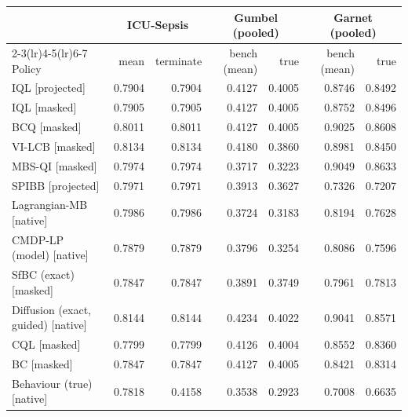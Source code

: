 \begin{tabular}{lrrrrrr}
\toprule
 & \multicolumn{2}{c}{ICU-Sepsis} & \multicolumn{2}{c}{Gumbel (pooled)} & \multicolumn{2}{c}{Garnet (pooled)} \\
\cmidrule(lr){2-3}\cmidrule(lr){4-5}\cmidrule(lr){6-7}
Policy & mean & terminate & bench (mean) & true & bench (mean) & true \\
\midrule
IQL [projected] & 0.7904 & 0.7904 & 0.4127 & 0.4005 & 0.8746 & 0.8492 \\
IQL [masked] & 0.7905 & 0.7905 & 0.4127 & 0.4005 & 0.8752 & 0.8496 \\
BCQ [masked] & 0.8011 & 0.8011 & 0.4127 & 0.4005 & 0.9025 & 0.8608 \\
VI-LCB [masked] & 0.8134 & 0.8134 & 0.4180 & 0.3860 & 0.8981 & 0.8450 \\
MBS-QI [masked] & 0.7974 & 0.7974 & 0.3717 & 0.3223 & 0.9049 & 0.8633 \\
SPIBB [projected] & 0.7971 & 0.7971 & 0.3913 & 0.3627 & 0.7326 & 0.7207 \\
Lagrangian-MB [native] & 0.7986 & 0.7986 & 0.3724 & 0.3183 & 0.8194 & 0.7628 \\
CMDP-LP (model) [native] & 0.7879 & 0.7879 & 0.3796 & 0.3254 & 0.8086 & 0.7596 \\
SfBC (exact) [masked] & 0.7847 & 0.7847 & 0.3891 & 0.3749 & 0.7961 & 0.7813 \\
Diffusion (exact, guided) [native] & 0.8144 & 0.8144 & 0.4234 & 0.4022 & 0.9041 & 0.8571 \\
CQL [masked] & 0.7799 & 0.7799 & 0.4126 & 0.4004 & 0.8552 & 0.8360 \\
BC [masked] & 0.7847 & 0.7847 & 0.4127 & 0.4005 & 0.8421 & 0.8314 \\
Behaviour (true) [native] & 0.7818 & 0.4158 & 0.3538 & 0.2923 & 0.7008 & 0.6635 \\
\bottomrule
\end{tabular}
